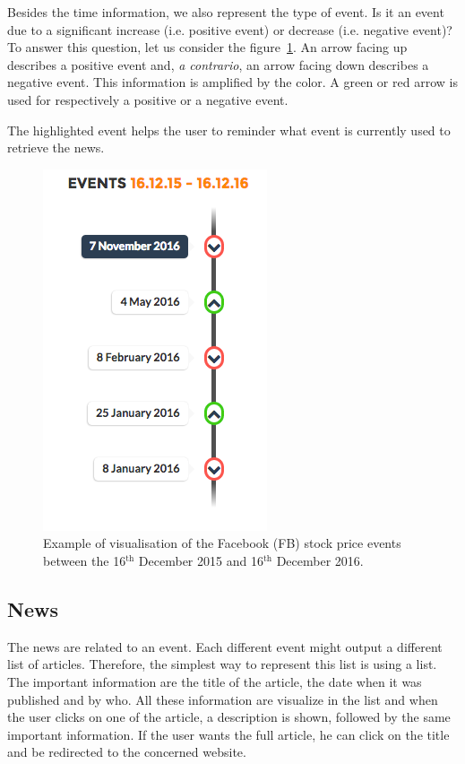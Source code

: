 Besides the time information, we also represent the type of event. Is it an event due to a significant increase (i.e. positive event) or decrease (i.e. negative event)? To answer this question, let us consider the figure~\ref{fig:event-timeline}. An arrow facing up describes a positive event and, \textit{a contrario}, an arrow facing down describes a negative event. This information is amplified by the color. A green or red arrow is used for respectively a positive or a negative event.

The highlighted event helps the user to reminder what event is currently used to retrieve the news.

\begin{figure}
    \centering
    \includegraphics[scale=0.5]{Figures/st-events.png}
    \caption{Example of visualisation of the Facebook (FB) stock price events between the 16$^{\text{th}}$ December 2015 and 16$^{\text{th}}$ December 2016.}
    \label{fig:event-timeline}
\end{figure}

\subsection{News}
The news are related to an event. Each different event might output a different list of articles. Therefore, the simplest way to represent this list is using a list. The important information are the title of the article, the date when it was published and by who. All these information are visualize in the list and when the user clicks on one of the article, a description is shown, followed by the same important information. If the user wants the full article, he can click on the title and be redirected to the concerned website.

